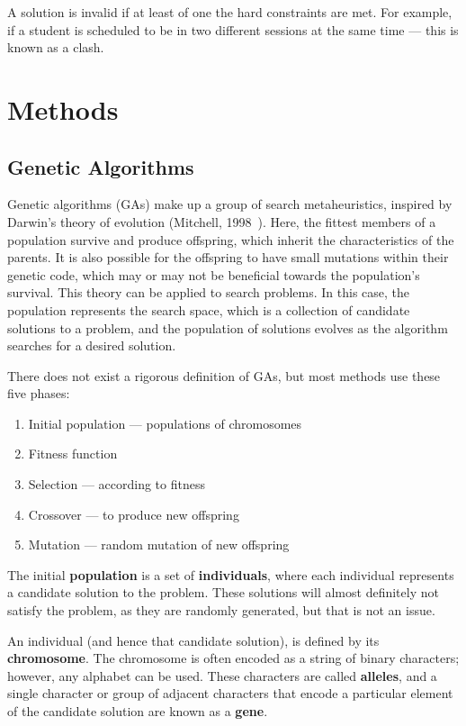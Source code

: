 A solution is invalid if at least of one the hard constraints are met.
For example, if a student is scheduled to be in two different sessions at the
same time --- this is known as a clash.

\section{Methods}

\subsection{Genetic Algorithms}

Genetic algorithms (GAs) make up a group of search metaheuristics, inspired by
Darwin's theory of evolution (Mitchell, 1998~\cite{ga_book}).
Here, the fittest members of a population survive and produce offspring, which
inherit the characteristics of the parents.
It is also possible for the offspring to have small mutations within their
genetic code, which may or may not be beneficial towards the population's
survival.
This theory can be applied to search problems.
In this case, the population represents the search space, which is a collection 
of candidate solutions to a problem, and the population of solutions evolves as
the algorithm searches for a desired solution.

There does not exist a rigorous definition of GAs, but most methods use these
five phases:

\begin{enumerate}
	\item Initial population --- populations of chromosomes
	\item Fitness function
	\item Selection --- according to fitness
	\item Crossover --- to produce new offspring
	\item Mutation --- random mutation of new offspring
\end{enumerate}

The initial \textbf{population} is a set of \textbf{individuals}, where each
individual represents a candidate solution to the problem.
These solutions will almost definitely not satisfy the problem, as they are
randomly generated, but that is not an issue.

An individual (and hence that candidate solution), is defined by its
\textbf{chromosome}.
The chromosome is often encoded as a string of binary characters; however, any
alphabet can be used.
These characters are called \textbf{alleles}, and a single character or group of
adjacent characters that encode a particular element of the candidate solution
are known as a \textbf{gene}.

